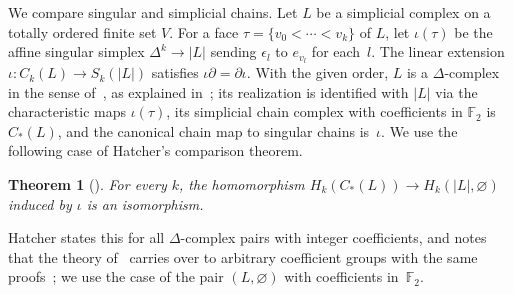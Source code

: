 \documentclass[11pt]{article}
\newtheorem{theorem}{Theorem}[section]
\theoremstyle{definition}
\numberwithin{equation}{section}
\newcommand{\F}{\mathbb F_2}
\begin{document}
We compare singular and simplicial chains. Let $L$ be a simplicial complex on a totally ordered finite set $V$. For a face $\tau=\{v_0<\cdots<v_k\}$ of $L$, let $\iota(\tau)$ be the affine singular simplex $\Delta^k\to|L|$ sending $\epsilon_l$ to $e_{v_l}$ for each~$l$. The linear extension $\iota:C_k(L)\to S_k(|L|)$ satisfies $\iota\partial=\partial\iota$. With the given order, $L$ is a $\Delta$-complex in the sense of~\cite[p.~103]{Hatcher}, as explained in~\cite[p.~107]{Hatcher}; its realization is identified with $|L|$ via the characteristic maps $\iota(\tau)$, its simplicial chain complex with coefficients in $\F$ is $C_\ast(L)$, and the canonical chain map to singular chains is~$\iota$. We use the following case of Hatcher's comparison theorem.

\begin{theorem}[{\cite[Theorem~2.27, p.~128]{Hatcher}}]\label{thm:hatcher}
For every $k$, the homomorphism $H_k(C_\ast(L))\to H_k(|L|,\varnothing)$ induced by $\iota$ is an isomorphism.
\end{theorem}

Hatcher states this for all $\Delta$-complex pairs with integer coefficients, and notes that the theory of~\cite[\S2.1]{Hatcher} carries over to arbitrary coefficient groups with the same proofs~\cite[p.~153]{Hatcher}; we use the case of the pair $(L,\varnothing)$ with coefficients in~$\F$.
\end{document}
